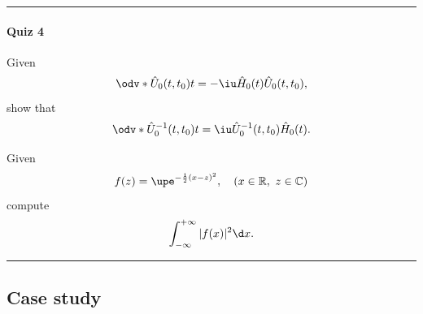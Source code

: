 \hrule

\paragraph{Quiz 4}

\begin{problem}
  Given
  \[
    \odv*{\hat U_0(t,t_0)}t = -\iu \hat H_0(t) \hat U_0(t,t_0),
  \]
  show that
  \[
    \odv*{\hat U_0^{-1}(t,t_0)}t = \iu \hat U_0^{-1}(t,t_0) \hat H_0(t).
  \]
\end{problem}
\begin{solution}
  
\end{solution}

\begin{problem}
  Given
  \[
    f(z) = \upe^{-\frac12(x-z)^2}, \quad (x \in \mathbb R,~ z \in \mathbb C)
  \]
  compute
  \[
    \int_{-\infty}^{+\infty} |f(x)|^2 \d x.
  \]
\end{problem}
\hrule

\subsection{Case study}

